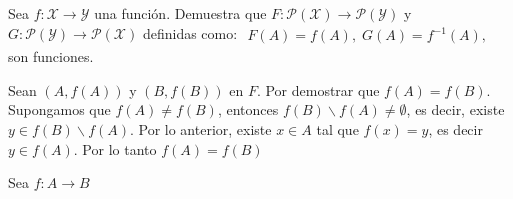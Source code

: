 \documentclass[fc]{tarea}
\newcommand{\menos}{\backslash}
\begin{document}
\begin{exercise}
 Sea $f: \mathcal{X} \to \mathcal{Y}$ una función. Demuestra que $F: \mathcal{P}(\mathcal{X}) \to \mathcal{P}(\mathcal{Y})$
 y $G: \mathcal{P}(\mathcal{Y}) \to \mathcal{P}(\mathcal{X})$ definidas como: $\begin{aligned}
    F(A) = f(A),\; G(A) = f^{-1}(A),
 \end{aligned}$
son funciones.
\end{exercise}

\begin{solution}
Sean $(A, f(A))$ y $(B, f(B))$ en $F$. Por demostrar que $f(A)=f(B)$. Supongamos que $f(A) \neq f(B)$, entonces
$f(B) \menos f(A) \neq \emptyset$, es decir, existe $y \in f(B) \menos f(A)$. Por lo anterior, existe $x \in A$ tal que
$f(x) = y$, es decir $y \in f(A)$. Por lo tanto $f(A) = f(B)$
\end{solution}

\begin{exercise}
Sea $f: A \to B$
\end{exercise}

\begin{solution}

\end{solution}
\end{document}
